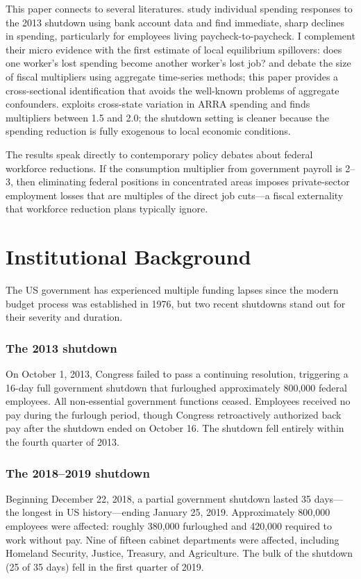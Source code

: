 \documentclass[12pt]{article}
\begin{document}
This paper connects to several literatures. \citet{gelman2023government} study individual spending responses to the 2013 shutdown using bank account data and find immediate, sharp declines in spending, particularly for employees living paycheck-to-paycheck. I complement their micro evidence with the first estimate of local equilibrium spillovers: does one worker's lost spending become another worker's lost job? \citet{auerbach2012measuring} and \citet{ramey2011identifying} debate the size of fiscal multipliers using aggregate time-series methods; this paper provides a cross-sectional identification that avoids the well-known problems of aggregate confounders. \citet{wilson2012fiscal} exploits cross-state variation in ARRA spending and finds multipliers between 1.5 and 2.0; the shutdown setting is cleaner because the spending reduction is fully exogenous to local economic conditions.

The results speak directly to contemporary policy debates about federal workforce reductions. If the consumption multiplier from government payroll is 2--3, then eliminating federal positions in concentrated areas imposes private-sector employment losses that are multiples of the direct job cuts---a fiscal externality that workforce reduction plans typically ignore.

\section{Institutional Background}

The US government has experienced multiple funding lapses since the modern budget process was established in 1976, but two recent shutdowns stand out for their severity and duration.

\subsubsection*{The 2013 shutdown} On October 1, 2013, Congress failed to pass a continuing resolution, triggering a 16-day full government shutdown that furloughed approximately 800,000 federal employees. All non-essential government functions ceased. Employees received no pay during the furlough period, though Congress retroactively authorized back pay after the shutdown ended on October 16. The shutdown fell entirely within the fourth quarter of 2013.

\subsubsection*{The 2018--2019 shutdown} Beginning December 22, 2018, a partial government shutdown lasted 35 days---the longest in US history---ending January 25, 2019. Approximately 800,000 employees were affected: roughly 380,000 furloughed and 420,000 required to work without pay. Nine of fifteen cabinet departments were affected, including Homeland Security, Justice, Treasury, and Agriculture. The bulk of the shutdown (25 of 35 days) fell in the first quarter of 2019.
\end{document}
